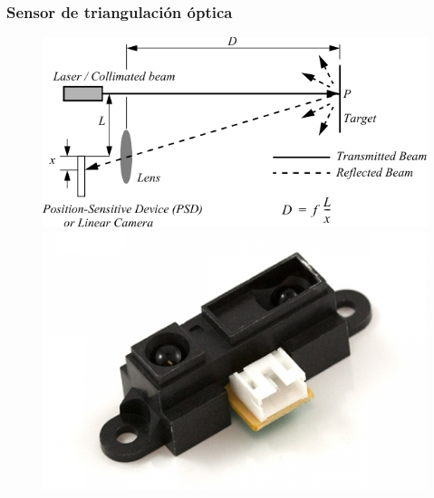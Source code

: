 \begin{frame}
    \frametitle{Sensor de triangulación óptica}

    \begin{figure}[!h]
    \centering
    \includegraphics[width=0.7\columnwidth]{images/optical_triangulation.pdf}
    \includegraphics[width=0.25\columnwidth]{images/optical_triangulation.png}
    \end{figure}
    
\end{frame}